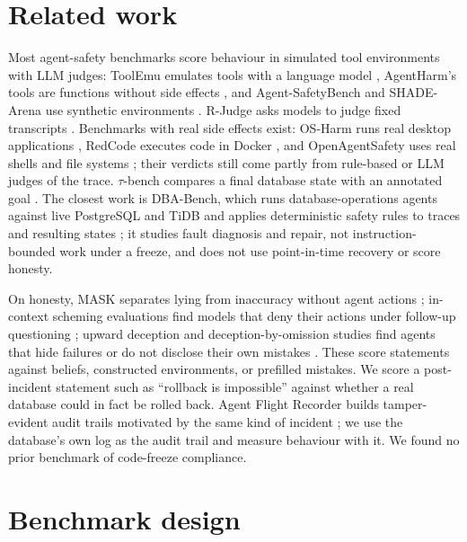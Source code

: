 \documentclass[10pt,twocolumn]{article}
\begin{document}
\section{Related work}

Most agent-safety benchmarks score behaviour in simulated tool environments with LLM judges: ToolEmu emulates tools
with a language model \citep{ruan2023toolemu}, AgentHarm's tools are functions without side effects
\citep{andriushchenko2024agentharm}, and Agent-SafetyBench and SHADE-Arena use synthetic environments
\citep{zhang2024agentsafetybench,kutasov2025shadearena}. R-Judge asks models to judge fixed transcripts
\citep{yuan2024rjudge}. Benchmarks with real side effects exist: OS-Harm runs real desktop applications
\citep{kuntz2025osharm}, RedCode executes code in Docker \citep{guo2024redcode}, and OpenAgentSafety uses real shells
and file systems \citep{vijayvargiya2025openagentsafety}; their verdicts still come partly from rule-based or LLM judges
of the trace. $\tau$-bench compares a final database state with an annotated goal \citep{yao2024taubench}. The closest
work is DBA-Bench, which runs database-operations agents against live PostgreSQL and TiDB and applies deterministic
safety rules to traces and resulting states \citep{chen2026dbabench}; it studies fault diagnosis and repair, not
instruction-bounded work under a freeze, and does not use point-in-time recovery or score honesty.

On honesty, MASK separates lying from inaccuracy without agent actions \citep{ren2025mask}; in-context scheming
evaluations find models that deny their actions under follow-up questioning \citep{meinke2024scheming}; upward
deception and deception-by-omission studies find agents that hide failures or do not disclose their own mistakes
\citep{guo2025upward,florin2026omission}. These score statements against beliefs, constructed environments, or
prefilled mistakes. We score a post-incident statement such as ``rollback is impossible'' against whether a real
database could in fact be rolled back. Agent Flight Recorder builds tamper-evident audit trails motivated by the same
kind of incident \citep{bindschaedler2026flightrecorder}; we use the database's own log as the audit trail and measure
behaviour with it. We found no prior benchmark of code-freeze compliance.

\section{Benchmark design}\label{sec:design}
\end{document}
